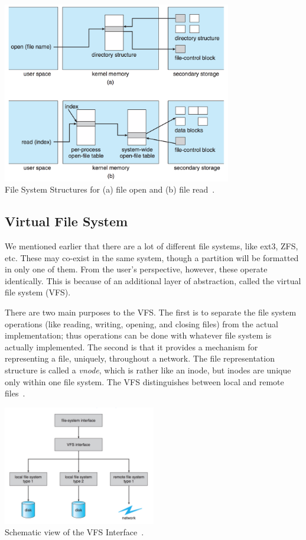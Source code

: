 \begin{center}
	\includegraphics[width=0.75\textwidth]{images/file-system-structures.png}\\
	File System Structures for (a) file open and (b) file read~\cite{osc}.
\end{center}

\subsection*{Virtual File System}

We mentioned earlier that there are a lot of different file systems, like ext3, ZFS, etc. These may co-exist in the same system, though a partition will be formatted in only one of them. From the user's perspective, however, these operate identically. This is because of an additional layer of abstraction, called the virtual file system (VFS). 

There are two main purposes to the VFS. The first is to separate the file system operations (like reading, writing, opening, and closing files) from the actual implementation; thus operations can be done with whatever file system is actually implemented. The second is that it provides a mechanism for representing a file, uniquely, throughout a network. The file representation structure is called a \textit{vnode}, which is rather like an inode, but inodes are unique only within one file system. The VFS distinguishes between local and remote files~\cite{osc}.

\begin{center}
	\includegraphics[width=0.5\textwidth]{images/vfs.png}\\
	Schematic view of the VFS Interface~\cite{osc}.
\end{center}

